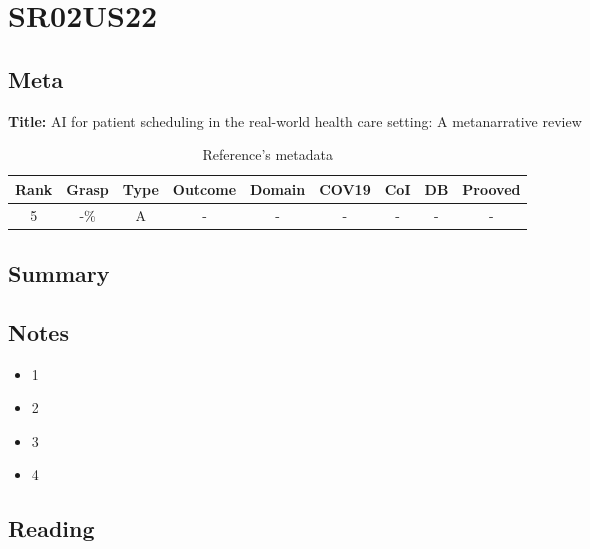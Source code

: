 \section{ SR02US22 }


\subsection{Meta}

    \textbf{Title:}
    AI for patient scheduling in the real-world health care setting: A metanarrative review

    \begin{table}[H]
        \centering
        \begin{tabular}{|c|c|c|c|c|c|c|c|c|}
            \hline
                \textbf{Rank} & \textbf{Grasp} & \textbf{Type} & \textbf{Outcome} & \textbf{Domain} & \textbf{COV19} & \textbf{CoI} & \textbf{DB} & \textbf{Prooved} \\
            \hline
                5 & -\% & A & - & - & - & - & - & - \\
            \hline
        \end{tabular}
        \caption{Reference's metadata}
        \label{tab:SR01US23}
    \end{table}

\subsection{Summary}
    

\subsection{Notes}
    \begin{itemize}
        \item 1
        \item 2
        \item 3
        \item 4
    \end{itemize}


\subsection{Reading}